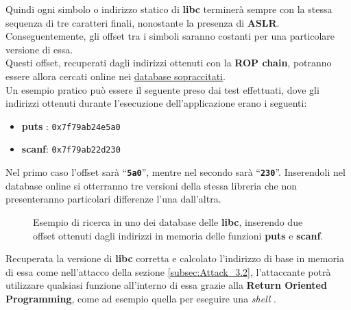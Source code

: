 Quindi ogni simbolo o indirizzo statico di \textbf{libc} terminerà sempre con la stessa sequenza di tre caratteri finali, nonostante la presenza di \textbf{ASLR}. Conseguentemente, gli offset tra i simboli saranno costanti per una particolare versione di essa.\\ 
Questi offset, recuperati dagli indirizzi ottenuti con la \textbf{ROP chain}, potranno essere allora cercati online nei \hyperref[libc-db]{database sopraccitati}.\\
Un esempio pratico può essere il seguente preso dai test effettuati, dove gli indirizzi ottenuti durante l'esecuzione dell'applicazione erano i seguenti: 
\begin{itemize}
    \item \textbf{puts} \space: \texttt{0x7f79ab24e5a0}
    \item \textbf{scanf}: \texttt{0x7f79ab22d230}
\end{itemize}
Nel primo caso l'offset sarà ``\textbf{\texttt{5a0}}'', mentre nel secondo sarà ``\textbf{\texttt{230}}''. Inserendoli nel database online si otterranno tre versioni della stessa libreria che non presenteranno particolari differenze l'una dall'altra. 

\begin{figure}[htbp]
    \centerline{}
    \caption{Esempio di ricerca in uno dei database delle \textbf{libc}, inserendo due offset ottenuti dagli indirizzi in memoria delle funzioni \textbf{puts} e \textbf{scanf}.}
    \label{fig:libc-db}
\end{figure}

Recuperata la versione di \textbf{libc} corretta e calcolato l'indirizzo di base in memoria di essa come nell'attacco della sezione \ref{subsec:Attack_3.2}, l'attaccante potrà utilizzare qualsiasi funzione all'interno di essa grazie alla \textbf{Return Oriented Programming}, come ad esempio quella per eseguire una \textit{shell} \cite*{find-libc-version}.

